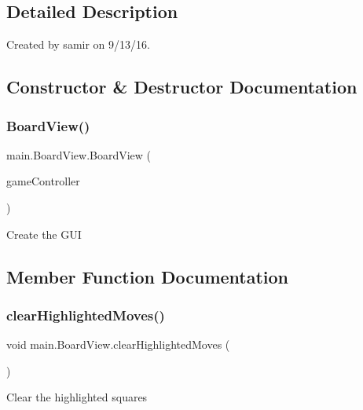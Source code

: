 \subsection{Detailed Description}
Created by samir on 9/13/16. 

\subsection{Constructor \& Destructor Documentation}
\hypertarget{classmain_1_1_board_view_afe3a4667992e92840f301182e8a5531e}{}\label{classmain_1_1_board_view_afe3a4667992e92840f301182e8a5531e} 
\subsubsection{\texorpdfstring{Board\+View()}{BoardView()}}
{\footnotesize\ttfamily main.\+Board\+View.\+Board\+View (\begin{DoxyParamCaption}\item[{\hyperlink{classmain_1_1_game_controller}{Game\+Controller}}]{game\+Controller }\end{DoxyParamCaption})}

Create the G\+UI 

\subsection{Member Function Documentation}
\hypertarget{classmain_1_1_board_view_ade8846909c28b72183b98969738d2241}{}\label{classmain_1_1_board_view_ade8846909c28b72183b98969738d2241} 
\subsubsection{\texorpdfstring{clear\+Highlighted\+Moves()}{clearHighlightedMoves()}}
{\footnotesize\ttfamily void main.\+Board\+View.\+clear\+Highlighted\+Moves (\begin{DoxyParamCaption}{ }\end{DoxyParamCaption})}

Clear the highlighted squares \hypertarget{classmain_1_1_board_view_ac99be3e6d9ed0a37b4021a1d784e9441}{}\label{classmain_1_1_board_view_ac99be3e6d9ed0a37b4021a1d784e9441} 
